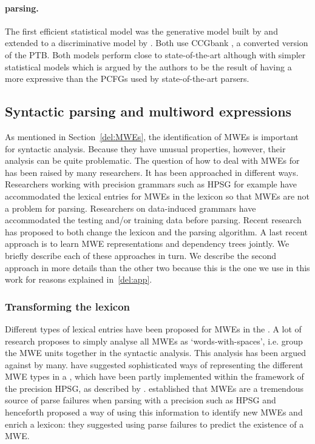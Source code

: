 \documentclass[output=paper]{langsci/langscibook}
\begin{document}
                        \paragraph*{ parsing.}
                        \indent The first efficient statistical model was the generative model built by \citet{hockenmaier2002} and extended to a discriminative model by \citet{clarkcurran2007}. Both use CCGbank \citep{hockenmaier2007}, a  converted version of the PTB. Both models perform close to state-of-the-art although with simpler statistical models which is argued by the authors to be the result of having a more expressive  than the PCFGs used by state-of-the-art parsers.

                        \subsection{Syntactic parsing and multiword expressions}
                        \label{del:syntacticparsingandMWES}
                        \indent As mentioned in Section~\ref{del:MWEs}, the identification of MWEs is important for syntactic analysis. Because they have unusual properties, however, their analysis can be quite problematic. The question of how to deal with MWEs for  has been raised by many researchers. It has been approached in different ways. Researchers working with precision grammars such as HPSG for example have accommodated the lexical entries for MWEs in the lexicon so that MWEs are not a problem for parsing. Researchers on data-induced grammars have accommodated the testing and/or training data before parsing. Recent research has proposed to both change the lexicon and the parsing algorithm. A last recent approach is to learn MWE representations and dependency trees jointly. We briefly describe each of these approaches in turn. We describe the second approach in more details than the other two because this is the one we use in this work for reasons explained in~\ref{del:app}.

                        \subsubsection{Transforming the lexicon}
                        \indent Different types of lexical entries have been proposed for MWEs in the . A lot of research proposes to simply analyse all MWEs as `words-with-spaces', i.e. group the MWE units together in the syntactic analysis. This analysis has been argued against by many. \citet{sag02} have suggested sophisticated ways of representing the different MWE types in a , which have been partly implemented within the framework of the precision  HPSG, as described by \citet{copestakeetal2002}. \citet{zhangetal2006} established that MWEs are a tremendous source of parse failures when parsing with a precision  such as HPSG and henceforth proposed a way of using this information to identify new MWEs and enrich a lexicon: they suggested using parse failures to predict the existence of a MWE.
\end{document}
